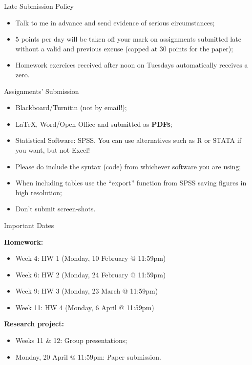 \documentclass[10pt]{beamer}   %
\begin{document}

\begin{frame}{Late Submission Policy}
\begin{itemize}
\item Talk to me in advance and send evidence of serious circumstances;
\item 5 points per day will be taken off your mark on assignments submitted late without a valid and previous excuse (capped at 30
points for the paper);
\item Homework exercices received after noon on Tuesdays automatically receives a zero.
\end{itemize}
\end{frame}


\begin{frame}{Assignments' Submission}

    \begin{itemize}
\item Blackboard/Turnitin (not by email!);    
\item \LaTeX, Word/Open Office and submitted as \textbf{PDFs};
    \item Statistical Software: SPSS. You can use alternatives such as R or STATA if you want, but not Excel!
    \item Please do include the syntax (code) from whichever software you are using;
 \item When including tables use the “export” function from SPSS saving figures in high resolution;
 \item Don't submit screen-shots.
    \end{itemize}
\end{frame}


\begin{frame}{Important Dates}


\textbf{Homework:}

\begin{itemize}
\item Week 4:   HW 1 (Monday, 10 February @ 11:59pm)
\item Week 6:   HW 2 (Monday, 24 February @ 11:59pm)
\item Week 9:   HW 3 (Monday, 23 March @ 11:59pm)
\item Week 11: HW 4 (Monday, 6 April @ 11:59pm)
\end{itemize}

\textbf{Research project:}

\begin{itemize}
\item Weeks 11 \& 12: Group presentations;
\item Monday, 20 April @ 11:59pm: Paper submission. 
\end{itemize}

\end{frame}
\end{document}
